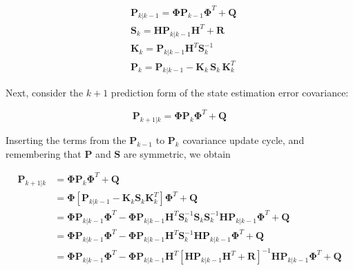 \begin{equation*}
    \begin{aligned}
        & \mathbf{P}_{k|k-1} = \mathbf{\Phi} \mathbf{P}_{k-1} \mathbf{\Phi}^T + \mathbf{Q} \\
        & \mathbf{S}_{k} = \mathbf{H} \mathbf{P}_{k|k-1} \mathbf{H}^T + \mathbf{R} \\
        & \mathbf{K}_{k} = \mathbf{P}_{k|k-1} \mathbf{H}^T \mathbf{S}_k^{-1} \\
        & \mathbf{P}_k = \mathbf{P}_{k|k-1} - \mathbf{K}_{k} \, \mathbf{S}_{k} \, \mathbf{K}_{k}^T
    \end{aligned}
\end{equation*}

Next, consider the $k+1$ prediction form of the state estimation error covariance:

\begin{equation*}
    \mathbf{P}_{k+1|k} = \mathbf{\Phi} \mathbf{P}_{k} \mathbf{\Phi}^T + \mathbf{Q}
\end{equation*}

Inserting the terms from the $\mathbf{P}_{k-1}$ to $\mathbf{P}_k$ covariance update cycle,
and remembering that $\mathbf{P}$ and $\mathbf{S}$ are symmetric, we obtain

\begin{equation*}
    \begin{aligned}
        \mathbf{P}_{k+1|k} &= \mathbf{\Phi} \mathbf{P}_{k} \mathbf{\Phi}^T + \mathbf{Q} \\
        &= \mathbf{\Phi} \left[ \mathbf{P}_{k|k-1} - \mathbf{K}_{k} \mathbf{S}_{k} \mathbf{K}_{k}^T \right] \mathbf{\Phi}^T + \mathbf{Q} \\
        &= \mathbf{\Phi} \mathbf{P}_{k|k-1} \mathbf{\Phi}^T - \mathbf{\Phi} \mathbf{P}_{k|k-1} \mathbf{H}^T \mathbf{S}_k^{-1} \mathbf{S}_{k} \mathbf{S}_k^{-1} \mathbf{H} \mathbf{P}_{k|k-1} \mathbf{\Phi}^T + \mathbf{Q} \\
        &= \mathbf{\Phi} \mathbf{P}_{k|k-1} \mathbf{\Phi}^T - \mathbf{\Phi} \mathbf{P}_{k|k-1} \mathbf{H}^T \mathbf{S}_k^{-1} \mathbf{H} \mathbf{P}_{k|k-1} \mathbf{\Phi}^T + \mathbf{Q} \\
        &= \mathbf{\Phi} \mathbf{P}_{k|k-1} \mathbf{\Phi}^T - \mathbf{\Phi} \mathbf{P}_{k|k-1} \mathbf{H}^T \left[ \mathbf{H} \mathbf{P}_{k|k-1} \mathbf{H}^T + \mathbf{R} \right]^{-1} \mathbf{H} \mathbf{P}_{k|k-1} \mathbf{\Phi}^T + \mathbf{Q}
    \end{aligned}
\end{equation*}

